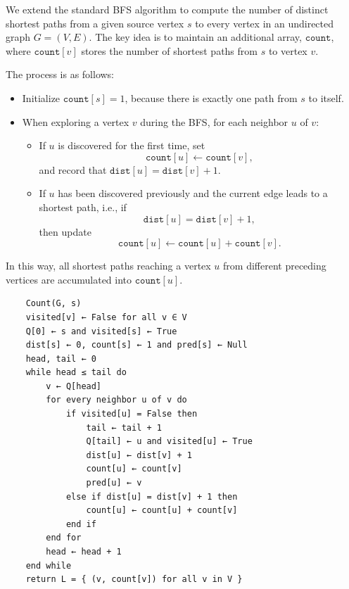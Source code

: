 \documentclass[letterpaper, 11pt]{article}
\newcommand{\1}{\mathds{1}}	%
\theoremstyle{definition}
\newenvironment{solution}{{\par\noindent\it Solution.}}{}
\begin{document}
\begin{solution}
    We extend the standard BFS algorithm to compute the number of distinct shortest paths from a given source vertex \(s\) to every vertex in an undirected graph \(G = (V,E)\). The key idea is to maintain an additional array, \(\mathtt{count}\), where \(\mathtt{count}[v]\) stores the number of shortest paths from \(s\) to vertex \(v\).

    The process is as follows:
    \begin{itemize}
        \item Initialize \(\mathtt{count}[s] = 1\), because there is exactly one path from \(s\) to itself.
        \item When exploring a vertex \(v\) during the BFS, for each neighbor \(u\) of \(v\):
        \begin{itemize}
            \item If \(u\) is discovered for the first time, set
            \[
            \mathtt{count}[u] \gets \mathtt{count}[v],
            \]
            and record that \(\texttt{dist}[u] = \texttt{dist}[v] + 1\).
            \item If \(u\) has been discovered previously and the current edge leads to a shortest path, i.e., if
            \[
            \texttt{dist}[u] = \texttt{dist}[v] + 1,
            \]
            then update
            \[
            \mathtt{count}[u] \gets \mathtt{count}[u] + \mathtt{count}[v].
            \]
        \end{itemize}
    \end{itemize}
    
    In this way, all shortest paths reaching a vertex \(u\) from different preceding vertices are accumulated into \(\mathtt{count}[u]\).
\begin{lstlisting}
    Count(G, s)
    visited[v] ← False for all v ∈ V
    Q[0] ← s and visited[s] ← True
    dist[s] ← 0, count[s] ← 1 and pred[s] ← Null 
    head, tail ← 0
    while head ≤ tail do
        v ← Q[head]
        for every neighbor u of v do
            if visited[u] = False then
                tail ← tail + 1
                Q[tail] ← u and visited[u] ← True
                dist[u] ← dist[v] + 1
                count[u] ← count[v]        
                pred[u] ← v
            else if dist[u] = dist[v] + 1 then
                count[u] ← count[u] + count[v] 
            end if
        end for
        head ← head + 1
    end while
    return L = { (v, count[v]) for all v in V }
\end{lstlisting}

\end{solution}
\end{document}
